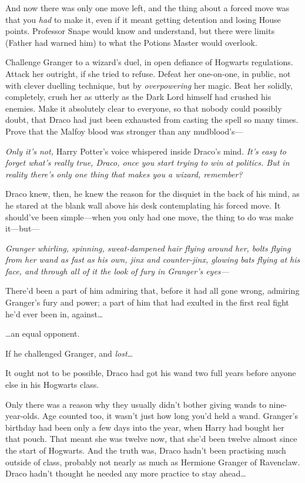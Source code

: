 And now there was only one move left, and the thing about a forced move was that you \emph{had} to make it, even if it meant getting detention and losing House points. Professor Snape would know and understand, but there were limits (Father had warned him) to what the Potions Master would overlook.

Challenge Granger to a wizard’s duel, in open defiance of Hogwarts regulations. Attack her outright, if she tried to refuse. Defeat her one-on-one, in public, not with clever duelling technique, but by \emph{overpowering} her magic. Beat her solidly, completely, crush her as utterly as the Dark Lord himself had crushed his enemies. Make it absolutely clear to everyone, so that nobody could possibly doubt, that Draco had just been exhausted from casting the spell so many times. Prove that the Malfoy blood was stronger than any mudblood’s—

\emph{Only it’s not,} Harry Potter’s voice whispered inside Draco’s mind. \emph{It’s easy to forget what’s really true, Draco, once you start trying to win at politics. But in reality there’s only one thing that makes you a wizard, remember?}

Draco knew, then, he knew the reason for the disquiet in the back of his mind, as he stared at the blank wall above his desk contemplating his forced move. It should’ve been simple—when you only had one move, the thing to do was make it—but—

\emph{Granger whirling, spinning, sweat-dampened hair flying around her, bolts flying from her wand as fast as his own, jinx and counter-jinx, glowing bats flying at his face, and through all of it the look of fury in Granger’s eyes—}

There’d been a part of him admiring that, before it had all gone wrong, admiring Granger’s fury and power; a part of him that had exulted in the first real fight he’d ever been in, against…

…an equal opponent.

If he challenged Granger, and \emph{lost…}

It ought not to be possible, Draco had got his wand two full years before anyone else in his Hogwarts class.

Only there was a reason why they usually didn’t bother giving wands to nine-year-olds. Age counted too, it wasn’t just how long you’d held a wand. Granger’s birthday had been only a few days into the year, when Harry had bought her that pouch. That meant she was twelve now, that she’d been twelve almost since the start of Hogwarts. And the truth was, Draco hadn’t been practising much outside of class, probably not nearly as much as Hermione Granger of Ravenclaw. Draco hadn’t thought he needed any more practice to stay ahead…

